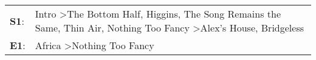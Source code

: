 \begin{supertabular}{p{0.03\textwidth}p{0.92\textwidth}}
 \textbf{S1}:  &  Intro\textsuperscript{} \textgreater \enspace The Bottom Half\textsuperscript{}, \enspace Higgins\textsuperscript{}, \enspace The Song Remains the Same\textsuperscript{}, \enspace Thin Air\textsuperscript{}, \enspace Nothing Too Fancy\textsuperscript{} \textgreater \enspace Alex's House\textsuperscript{}, \enspace Bridgeless\textsuperscript{}  \enspace  \\
 \textbf{E1}:  &                                                                                                                                                                                                                                                                        Africa\textsuperscript{} \textgreater \enspace Nothing Too Fancy\textsuperscript{}  \enspace  \\
\end{supertabular}
